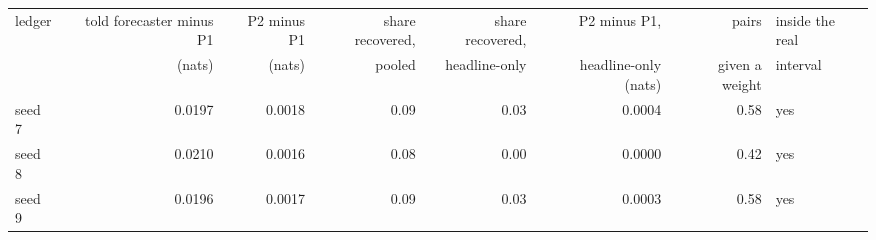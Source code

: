\begin{tabular}{lrrrrrrl}
\toprule
ledger & told forecaster minus P1 & P2 minus P1 & share recovered, & share recovered, & P2 minus P1, & pairs & inside the real \\
 & (nats) & (nats) & pooled & headline-only & headline-only (nats) & given a weight & interval \\
\midrule
seed 7 & 0.0197 & 0.0018 & 0.09 & 0.03 & 0.0004 & 0.58 & yes \\
seed 8 & 0.0210 & 0.0016 & 0.08 & 0.00 & 0.0000 & 0.42 & yes \\
seed 9 & 0.0196 & 0.0017 & 0.09 & 0.03 & 0.0003 & 0.58 & yes \\

\end{tabular}
